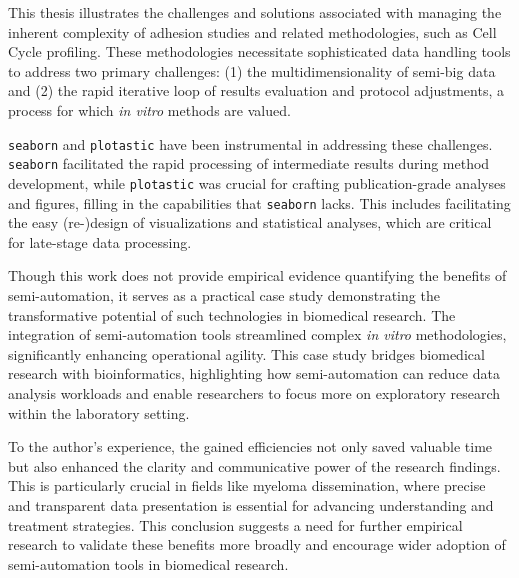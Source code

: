
 


%
\label{sec:discussion_conclusion_semi_automation}%
This thesis illustrates the challenges and solutions associated with managing
the inherent complexity of adhesion studies and related methodologies, such as
Cell Cycle profiling. These methodologies necessitate sophisticated data
handling tools to address two primary challenges: (1) the multidimensionality of
semi-big data and (2) the rapid iterative loop of results evaluation and protocol
adjustments, a process for which \textit{in vitro} methods are valued.

\texttt{seaborn} and \texttt{plotastic} have been instrumental in addressing
these challenges. \texttt{seaborn} facilitated the rapid processing of
intermediate results during method development, while \texttt{plotastic} was
crucial for crafting publication-grade analyses and figures, filling in the
capabilities that \texttt{seaborn} lacks. This includes facilitating the easy
(re-)design of visualizations and statistical analyses, which are critical for
late-stage data processing.

Though this work does not provide empirical evidence quantifying the benefits of
semi-automation, it serves as a practical case study demonstrating the
transformative potential of such technologies in biomedical research. The
integration of semi-automation tools streamlined complex \textit{in vitro}
methodologies, significantly enhancing operational agility. This case study
bridges biomedical research with bioinformatics, highlighting how
semi-automation can reduce data analysis workloads and enable researchers to
focus more on exploratory research within the laboratory setting.

To the author's experience, the gained efficiencies not only saved valuable time
but also enhanced the clarity and communicative power of the research findings.
This is particularly crucial in fields like myeloma dissemination, where precise
and transparent data presentation is essential for advancing understanding and
treatment strategies. This conclusion suggests a need for further empirical
research to validate these benefits more broadly and encourage wider adoption of
semi-automation tools in biomedical research.


